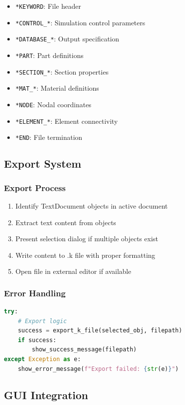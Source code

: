 \documentclass[12pt,a4paper]{article}
\begin{document}
\begin{itemize}
    \item \texttt{*KEYWORD}: File header
    \item \texttt{*CONTROL\_*}: Simulation control parameters
    \item \texttt{*DATABASE\_*}: Output specification
    \item \texttt{*PART}: Part definitions
    \item \texttt{*SECTION\_*}: Section properties
    \item \texttt{*MAT\_*}: Material definitions
    \item \texttt{*NODE}: Nodal coordinates
    \item \texttt{*ELEMENT\_*}: Element connectivity
    \item \texttt{*END}: File termination
\end{itemize}

\subsection{Export System}

\subsubsection{Export Process}
\begin{enumerate}
    \item Identify TextDocument objects in active document
    \item Extract text content from objects
    \item Present selection dialog if multiple objects exist
    \item Write content to .k file with proper formatting
    \item Open file in external editor if available
\end{enumerate}

\subsubsection{Error Handling}
\begin{lstlisting}[language=Python, caption=Export error handling]
try:
    # Export logic
    success = export_k_file(selected_obj, filepath)
    if success:
        show_success_message(filepath)
except Exception as e:
    show_error_message(f"Export failed: {str(e)}")
\end{lstlisting}

\subsection{GUI Integration}
\end{document}
